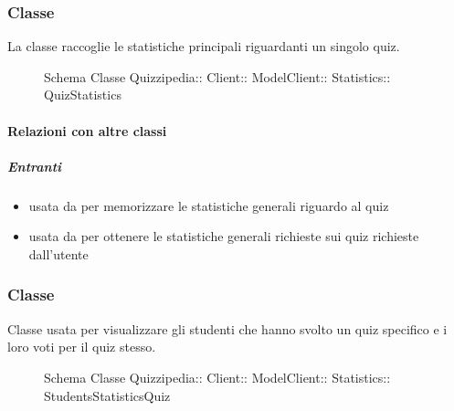 \subsubsection{Classe }
La classe raccoglie le statistiche principali riguardanti un singolo quiz.
\begin{figure}[H]
\centering
\noindent{}
\caption[Schema Classe QuizStatistics]{Schema Classe Quizzipedia:: Client:: ModelClient:: Statistics:: QuizStatistics}
\end{figure}
\paragraph{Relazioni con altre classi}
\subparagraph{Entranti}
\begin{itemize}
\item usata da  per memorizzare le statistiche generali riguardo al quiz
\item usata da  per ottenere le statistiche generali richieste sui quiz richieste dall'utente
\end{itemize}
\subsubsection{Classe }
Classe usata per visualizzare gli studenti che hanno svolto un quiz specifico e i loro voti per il quiz stesso.
\begin{figure}[H]
\centering
\noindent{}
\caption[Schema Classe StudentsStatisticsQuiz]{Schema Classe Quizzipedia:: Client:: ModelClient:: Statistics:: StudentsStatisticsQuiz}
\end{figure}
